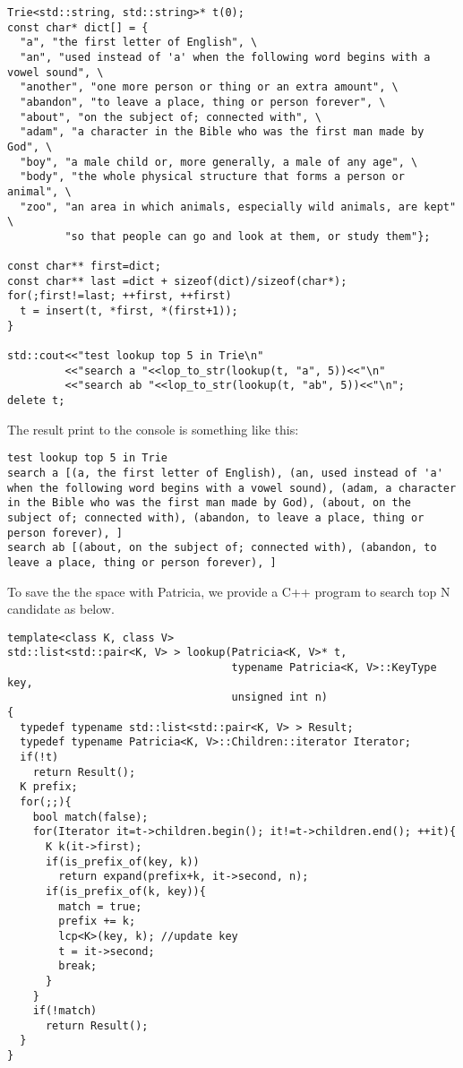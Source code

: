 \documentclass{article}
\begin{document}
\begin{lstlisting}
Trie<std::string, std::string>* t(0);
const char* dict[] = {
  "a", "the first letter of English", \
  "an", "used instead of 'a' when the following word begins with a vowel sound", \
  "another", "one more person or thing or an extra amount", \
  "abandon", "to leave a place, thing or person forever", \
  "about", "on the subject of; connected with", \
  "adam", "a character in the Bible who was the first man made by God", \
  "boy", "a male child or, more generally, a male of any age", \
  "body", "the whole physical structure that forms a person or animal", \
  "zoo", "an area in which animals, especially wild animals, are kept" \
         "so that people can go and look at them, or study them"};

const char** first=dict;
const char** last =dict + sizeof(dict)/sizeof(char*);
for(;first!=last; ++first, ++first)
  t = insert(t, *first, *(first+1));
}

std::cout<<"test lookup top 5 in Trie\n"
         <<"search a "<<lop_to_str(lookup(t, "a", 5))<<"\n"
         <<"search ab "<<lop_to_str(lookup(t, "ab", 5))<<"\n";
delete t;
\end{lstlisting}

The result print to the console is something like this:

\begin{verbatim}
test lookup top 5 in Trie
search a [(a, the first letter of English), (an, used instead of 'a'
when the following word begins with a vowel sound), (adam, a character 
in the Bible who was the first man made by God), (about, on the 
subject of; connected with), (abandon, to leave a place, thing or 
person forever), ]
search ab [(about, on the subject of; connected with), (abandon, to 
leave a place, thing or person forever), ]
\end{verbatim}

To save the the space with Patricia, we provide a C++ program to
search top N candidate as below.

\begin{lstlisting}
template<class K, class V>
std::list<std::pair<K, V> > lookup(Patricia<K, V>* t, 
                                   typename Patricia<K, V>::KeyType key,
                                   unsigned int n)
{
  typedef typename std::list<std::pair<K, V> > Result;
  typedef typename Patricia<K, V>::Children::iterator Iterator;
  if(!t)
    return Result();
  K prefix;
  for(;;){
    bool match(false);
    for(Iterator it=t->children.begin(); it!=t->children.end(); ++it){
      K k(it->first);
      if(is_prefix_of(key, k))
        return expand(prefix+k, it->second, n);
      if(is_prefix_of(k, key)){
        match = true;
        prefix += k;
        lcp<K>(key, k); //update key
        t = it->second;
        break;
      }
    }
    if(!match)
      return Result();
  }
}
\end{lstlisting}
\end{document}
